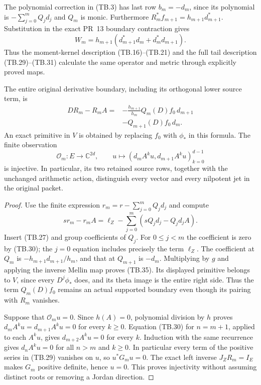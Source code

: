 The polynomial correction in (TB.3) has last row
\(b_m=-d_m\), since its polynomial is
\(-\sum_{j=0}^mQ_jd_j\) and \(Q_m\) is monic.
Furthermore
\(R_m^*f_{m+1}=h_{m+1}d_{m+1}^*\).
Substitution in the exact PR~13 boundary contraction gives
\[
 \boxed{W_m=h_{m+1}
       (d_{m+1}^*d_m+d_m^*d_{m+1}).}
 \tag{TB.31}
\]
Thus the moment-kernel description (TB.16)--(TB.21) and the
full tail description (TB.29)--(TB.31) calculate the same
operator and metric through explicitly proved maps.

\begin{theorem}
The entire original derivative boundary, including its
orthogonal lower source term, is
\[
 \boxed{\begin{aligned}
 DR_m-R_mA
 ={}&-\frac{h_{m+1}}{h_m}Q_m(D)f_0\,d_{m+1}\\
    &-Q_{m+1}(D)f_0\,d_m .
 \end{aligned}}
 \tag{TB.35}
\]
An exact primitive in \(V\) is obtained by replacing \(f_0\)
with \(\phi_*\) in this formula.  The finite observation
\[
 \mathcal O_m:E\longrightarrow\mathbb C^{2d},\qquad
 u\longmapsto(d_mA^ku,d_{m+1}A^ku)_{k=0}^{d-1}
 \tag{TB.36}
\]
is injective.  In particular, its two retained source rows,
together with the unchanged arithmetic action, distinguish
every vector and every nilpotent jet in the original packet.
\end{theorem}

\begin{proof}
Use the finite expression
\(r_m=r-\sum_{j=0}^mQ_jd_j\) and compute
\[
 sr_m-r_mA
 =\ell_Z-\sum_{j=0}^m(sQ_jd_j-Q_jd_jA).
\]
Insert (TB.27) and group coefficients of \(Q_j\).
For \(0\leq j<m\) the coefficient is zero by (TB.30);
the \(j=0\) equation includes precisely the term \(\ell_Z\).
The coefficient at \(Q_m\) is
\(-h_{m+1}d_{m+1}/h_m\), and that at \(Q_{m+1}\) is
\(-d_m\).  Multiplying by \(g\) and applying the inverse
Mellin map proves (TB.35).  Its displayed primitive belongs
to \(V\), since every \(D^j\phi_*\) does, and its theta
image is the entire right side.  Thus the term \(Q_m(D)f_0\)
remains an actual supported boundary even though its pairing
with \(R_m\) vanishes.

Suppose that \(\mathcal O_mu=0\).  Since \(h(A)=0\),
polynomial division by \(h\) proves
\(d_mA^ku=d_{m+1}A^ku=0\) for every \(k\geq0\).
Equation (TB.30) for \(n=m+1\), applied to each \(A^ku\),
gives \(d_{m+2}A^ku=0\) for every \(k\).
Induction with the same recurrence gives
\(d_nA^ku=0\) for all \(n>m\) and \(k\geq0\).
In particular every term of the positive series in (TB.29)
vanishes on \(u\), so \(u^*G_mu=0\).
The exact left inverse \(J_ZR_m=I_E\) makes \(G_m\)
positive definite, hence \(u=0\).
This proves injectivity without assuming distinct roots
or removing a Jordan direction.
\end{proof}


